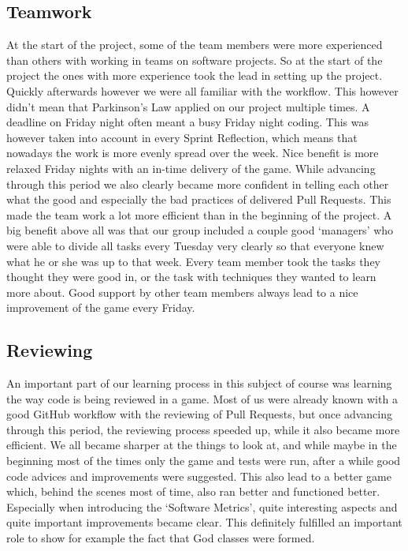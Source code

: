 \subsection{Teamwork}
At the start of the project, some of the team members were more experienced than others with working in teams on software projects. So at the start of the project the ones with more experience took the lead in setting up the project. Quickly afterwards however we were all familiar with the workflow. This however didn't mean that Parkinson's Law applied on our project multiple times. A deadline on Friday night often meant a busy Friday night coding. This was however taken into account in every Sprint Reflection, which means that nowadays the work is more evenly spread over the week. Nice benefit is more relaxed Friday nights with an in-time delivery of the game. While advancing through this period we also clearly became more confident in telling each other what the good and especially the bad practices of delivered Pull Requests. This made the team work a lot more efficient than in the beginning of the project. A big benefit above all was that our group included a couple good `managers' who were able to divide all tasks every Tuesday very clearly so that everyone knew what he or she was up to that week. Every team member took the tasks they thought they were good in, or the task with techniques they wanted to learn more about. Good support by other team members always lead to a nice improvement of the game every Friday. 

\subsection{Reviewing}
An important part of our learning process in this subject of course was learning the way code is being reviewed in a game. Most of us were already known with a good GitHub workflow with the reviewing of Pull Requests, but once advancing through this period, the reviewing process speeded up, while it also became more efficient. We all became sharper at the things to look at, and while maybe in the beginning most of the times only the game and tests were run, after a while good code advices and improvements were suggested. This also lead to a better game which, behind the scenes most of time, also ran better and functioned better. Especially when introducing the `Software Metrics', quite interesting aspects and quite important improvements became clear. This definitely fulfilled an important role to show for example the fact that God classes were formed.  

